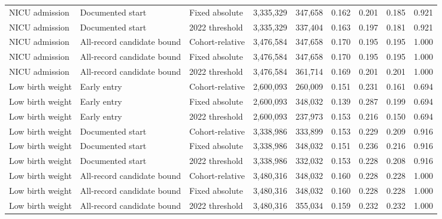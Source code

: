 \begin{table}[p]
{\begin{tabular}{lllrrrrrr}
NICU admission & Documented start & Fixed absolute & 3,335,329 & 347,658 & 0.162 & 0.201 & 0.185 & 0.921 \\
NICU admission & Documented start & 2022 threshold & 3,335,329 & 337,404 & 0.163 & 0.197 & 0.181 & 0.921 \\
NICU admission & All-record candidate bound & Cohort-relative & 3,476,584 & 347,658 & 0.170 & 0.195 & 0.195 & 1.000 \\
NICU admission & All-record candidate bound & Fixed absolute & 3,476,584 & 347,658 & 0.170 & 0.195 & 0.195 & 1.000 \\
NICU admission & All-record candidate bound & 2022 threshold & 3,476,584 & 361,714 & 0.169 & 0.201 & 0.201 & 1.000 \\
\addlinespace
Low birth weight & Early entry & Cohort-relative & 2,600,093 & 260,009 & 0.151 & 0.231 & 0.161 & 0.694 \\
Low birth weight & Early entry & Fixed absolute & 2,600,093 & 348,032 & 0.139 & 0.287 & 0.199 & 0.694 \\
Low birth weight & Early entry & 2022 threshold & 2,600,093 & 237,973 & 0.153 & 0.216 & 0.150 & 0.694 \\
Low birth weight & Documented start & Cohort-relative & 3,338,986 & 333,899 & 0.153 & 0.229 & 0.209 & 0.916 \\
Low birth weight & Documented start & Fixed absolute & 3,338,986 & 348,032 & 0.151 & 0.236 & 0.216 & 0.916 \\
Low birth weight & Documented start & 2022 threshold & 3,338,986 & 332,032 & 0.153 & 0.228 & 0.208 & 0.916 \\
Low birth weight & All-record candidate bound & Cohort-relative & 3,480,316 & 348,032 & 0.160 & 0.228 & 0.228 & 1.000 \\
Low birth weight & All-record candidate bound & Fixed absolute & 3,480,316 & 348,032 & 0.160 & 0.228 & 0.228 & 1.000 \\
Low birth weight & All-record candidate bound & 2022 threshold & 3,480,316 & 355,034 & 0.159 & 0.232 & 0.232 & 1.000 \\
\bottomrule
\end{tabular}%
}
\end{table}
